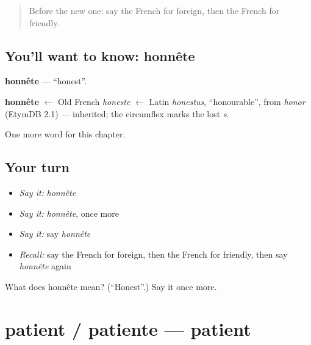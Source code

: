 \label{lesson:FR-C220-honnete}



\begin{quote}
Before the new one: say the French for foreign, then the French for friendly.
\end{quote}

\subsection*{You'll want to know: honnête}
\textbf{honnête} — \textquotedblleft{}honest\textquotedblright{}.

\begin{cousinweb}
\textbf{honnête} $\leftarrow$ Old French \emph{honeste} $\leftarrow$ Latin \emph{honestus}, \textquotedblleft{}honourable\textquotedblright{}, from \emph{honor} (EtymDB 2.1) — inherited; the circumflex marks the lost \emph{s}.
\end{cousinweb}

\begin{grammarlens}[title={What you've built}]
One more word for this chapter.
\end{grammarlens}

\subsection*{Your turn}
\begin{itemize}
\raggedright
  \item \emph{Say it:} \emph{honnête}
  \item \emph{Say it:} \emph{honnête}, once more
  \item \emph{Say it:} say \emph{honnête}
  \item \emph{Recall:} say the French for foreign, then the French for friendly, then say \emph{honnête} again
\end{itemize}

\begin{tcolorbox}[breakable,colback=teal!4,colframe=teal!35!black,title={Before you move on}]
What does honnête mean? (\textquotedblleft{}Honest\textquotedblright{}.) Say it once more.
\end{tcolorbox}
\section[patient / patiente]{patient / patiente — patient}

\label{lesson:FR-C220-patient-patiente}



